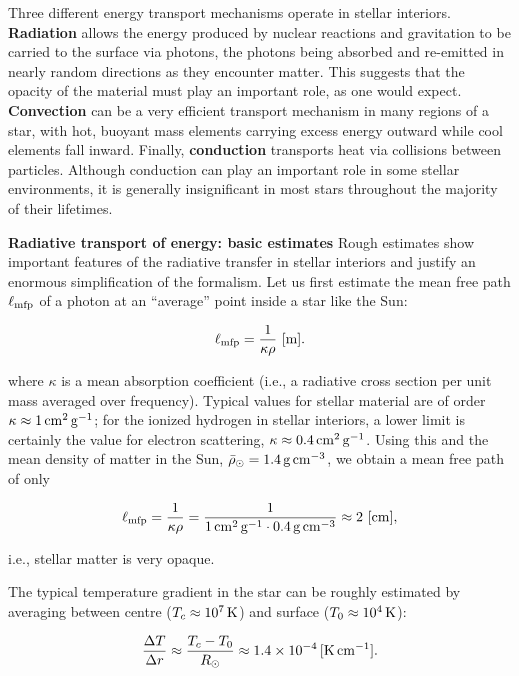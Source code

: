 \documentclass[a4paper,10pt]{article}
\begin{document}
{\noindent}Three different energy transport mechanisms operate in stellar interiors. \textbf{Radiation} allows the energy produced by nuclear reactions and gravitation to be carried to the surface via photons, the photons being absorbed and re-emitted in nearly random directions as they encounter matter. This suggests that the opacity of the material must play an important role, as one would expect. \textbf{Convection} can be a very efficient transport mechanism in many regions of a star, with hot, buoyant mass elements carrying excess energy outward while cool elements fall inward. Finally, \textbf{conduction} transports heat via collisions between particles. Although conduction can play an important role in some stellar environments, it is generally insignificant in most stars throughout the majority of their lifetimes. 

{\noindent}\textbf{Radiative transport of energy: basic estimates} Rough estimates show important features of the radiative transfer in stellar interiors and justify an enormous simplification of the formalism. Let us first estimate the mean free path $\ell_{\rm mfp}$ of a photon at an ``average'' point inside a star like the Sun:

\begin{align*}
    \ell_{\rm mfp} = \frac{1}{\kappa\rho} ~ [{\rm m}].
\end{align*}

{\noindent}where $\kappa$ is a mean absorption coefficient (i.e., a radiative cross section per unit mass averaged over frequency). Typical values for stellar material are of order $\kappa\approx1\,{\rm cm^2\,g^{-1}}$; for the ionized hydrogen in stellar interiors, a lower limit is certainly the value for electron scattering, $\kappa\approx0.4\,{\rm cm^2\,g^{-1}}$. Using this and the mean density of matter in the Sun, $\bar{\rho}_\odot=1.4\,{\rm g\,cm^{-3}}$, we obtain a mean free path of only

\begin{align*}
    \ell_{\rm mfp} = \frac{1}{\kappa\rho} = \frac{1}{1\,{\rm cm^2\,g^{-1}}\cdot0.4\,{\rm g\,cm^{-3}}} \approx2 ~ [{\rm cm}],
\end{align*}

{\noindent}i.e., stellar matter is very opaque.

{\noindent}The typical temperature gradient in the star can be roughly estimated by averaging between centre ($T_c\approx10^7\,{\rm K}$) and surface ($T_0\approx10^4\,{\rm K}$):

\begin{align*}
    \frac{\Delta T}{\Delta r} \approx \frac{T_c-T_0}{R_\odot} \approx 1.4\times10^{-4}\,[{\rm K\,cm^{-1}}].
\end{align*}
\end{document}
